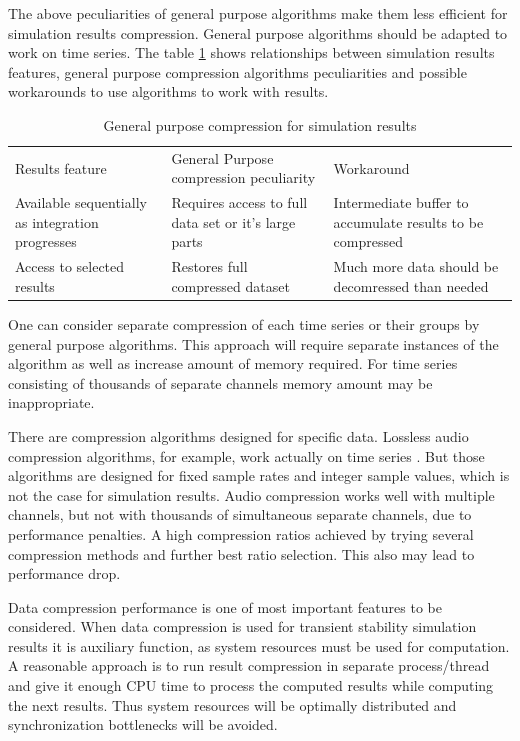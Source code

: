 \documentclass[lettersize,journal]{IEEEtran}
\begin{document}
The above peculiarities of general purpose algorithms make them less efficient for simulation 
results compression. General purpose algorithms should be adapted to work on time series. 
The table \ref{tab:gpcompr} shows relationships between simulation results features, general purpose
compression algorithms peculiarities and possible workarounds to use algorithms to work with
results.

\begin{table}[!h]
	\caption{General purpose compression for simulation results\label{tab:gpcompr}}
	\centering
	\begin{tabularx}{\columnwidth}{ 
			  >{\raggedright\arraybackslash}X 
			| >{\raggedright\arraybackslash}X 
			| >{\raggedright\arraybackslash}X }
		\hline
		Results feature & General Purpose compression peculiarity & Workaround\\
		\hlineB{3}	
		Available sequentially as integration progresses & 
		Requires access to full data set or it's large parts  &
		Intermediate buffer to accumulate results to be compressed\\
		\hline
		Access to selected results & 
		Restores full compressed dataset & 
		Much more data should be decomressed than needed\\
		\hline
	\end{tabularx}
\end{table}

One can consider separate compression of each time series or their groups by
general purpose algorithms. This approach will require separate instances
of the algorithm as well as increase amount of memory required. For time series
consisting of thousands of separate channels memory amount may be inappropriate.

There are compression algorithms designed for specific data. Lossless audio compression
algorithms, for example, work actually on time series \cite{lch03}. But those 
algorithms are designed for fixed sample rates and integer sample values, 
which is not the case for simulation results. Audio compression works well
with multiple channels, but not with thousands of simultaneous separate channels,
due to performance penalties. A high compression ratios achieved by trying
several compression methods and further best ratio selection. This also may
lead to performance drop.

Data compression performance is one of most important features to be considered.
When data compression is used for transient stability simulation results it
is auxiliary function, as system resources must be used for computation. 
A reasonable approach is to run result compression in separate process/thread and 
give it enough CPU time to process the computed results while computing the next results.
Thus system resources will be optimally distributed and synchronization bottlenecks will be avoided.
\end{document}
